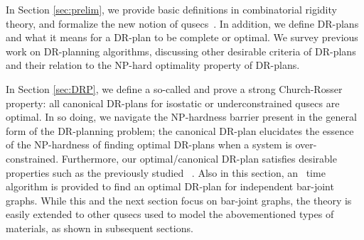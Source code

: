 In Section \ref{sec:prelim}, we provide basic definitions in combinatorial rigidity theory,  and formalize the new notion of qusecs~\cite{sitharam2010optimized,sitharam2006well,sitharam2010reconciling}.
In addition, we define DR-plans and what it means for a DR-plan to be complete or optimal. We survey previous work on DR-planning algorithms, discussing other desirable criteria of DR-plans and their relation to the NP-hard optimality property of DR-plans.



In Section \ref{sec:DRP}, we define a so-called  and prove a strong Church-Rosser property: all canonical DR-plans for isostatic or underconstrained qusecs are optimal. In so doing, we navigate the NP-hardness barrier present in the general form of the DR-planning problem; the canonical DR-plan elucidates the essence of the NP-hardness of finding optimal DR-plans when a system is over-constrained. Furthermore, our optimal/canonical DR-plan satisfies desirable properties such as the previously studied ~\cite{hoffman2001decompositionI}. Also in this section, an \ComplexityCanDRP\ time algorithm is provided to find an optimal DR-plan for independent bar-joint graphs. While this and the next section focus on bar-joint graphs, the theory is easily extended to other qusecs used to model the abovementioned types of materials, as shown in subsequent sections.


